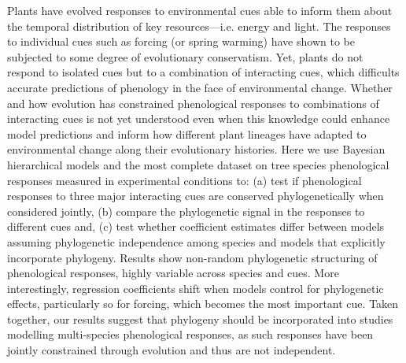 \documentclass{article}\usepackage[]{graphicx}\usepackage[]{color}
\begin{document}
Plants have evolved responses to environmental cues able to inform them about the temporal distribution of key resources---i.e. energy and light. The responses to individual cues such as forcing (or spring warming) have shown to be subjected to some degree of evolutionary conservatism. Yet, plants do not respond to isolated cues but to a combination of interacting cues, which difficults accurate predictions of phenology in the face of environmental change. Whether and how evolution has constrained phenological responses to combinations of interacting cues is not yet understood even when this knowledge could enhance model predictions and inform how different plant lineages have adapted to environmental change along their evolutionary histories. Here we use Bayesian hierarchical models and the most complete dataset on tree species phenological responses measured in experimental conditions to: (a) test if phenological responses to three major interacting cues are conserved phylogenetically when considered jointly, (b) compare the phylogenetic signal in the responses to different cues and, (c) test whether coefficient estimates differ between models assuming phylogenetic independence among species and models that explicitly incorporate phylogeny. Results show non-random phylogenetic structuring of phenological responses, highly variable across species and cues. More interestingly, regression coefficients shift when models control for phylogenetic effects, particularly so for forcing, which becomes the most important cue. Taken together, our results suggest that phylogeny should be incorporated into studies modelling multi-species phenological responses, as such responses have been jointly constrained through evolution and thus are not independent.  
\end{document}
